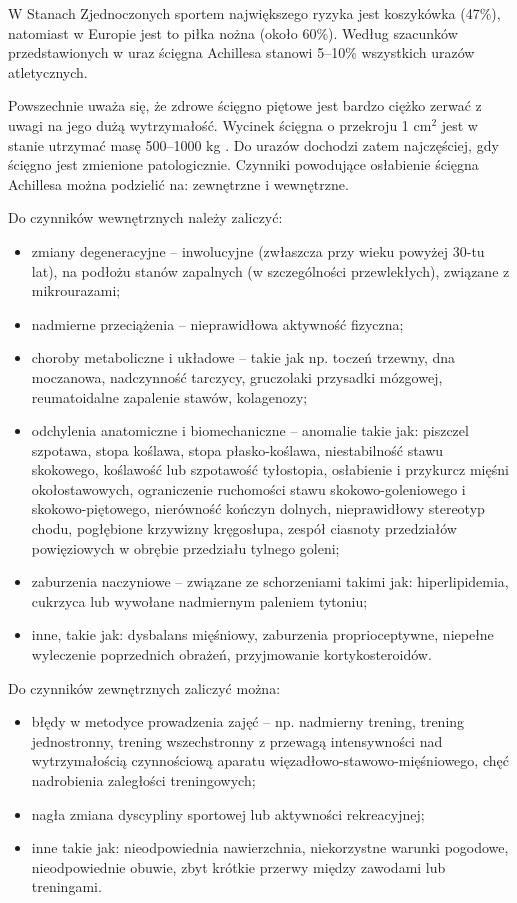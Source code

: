 \newpage
W Stanach Zjednoczonych sportem największego ryzyka jest koszykówka (47\%), natomiast w Europie jest to piłka nożna (około 60\%). Według szacunków przedstawionych w \cite{CHIRALI2014211} uraz ścięgna Achillesa stanowi 5--10\% wszystkich urazów atletycznych.

Powszechnie uważa się, że zdrowe ścięgno piętowe jest bardzo ciężko zerwać \linebreak z uwagi na jego dużą wytrzymałość. Wycinek ścięgna o przekroju 1 cm$^2$ jest w stanie utrzymać masę 500--1000 kg \cite{Maquirriain2011}. Do urazów dochodzi zatem najczęściej, gdy ścięgno jest zmienione patologicznie. Czynniki powodujące osłabienie ścięgna Achillesa można podzielić na: zewnętrzne i wewnętrzne.

Do czynników wewnętrznych należy zaliczyć:
\begin{itemize}[noitemsep,nolistsep]
	\item zmiany degeneracyjne -- inwolucyjne (zwłaszcza przy wieku powyżej 30-tu lat), na podłożu stanów zapalnych (w szczególności przewlekłych), związane z mikrourazami;
	\item nadmierne przeciążenia -- nieprawidłowa aktywność fizyczna;
	\item choroby metaboliczne i układowe -- takie jak np. toczeń trzewny, dna moczanowa, nadczynność tarczycy, gruczolaki przysadki mózgowej, reumatoidalne zapalenie stawów, kolagenozy;
	\item odchylenia anatomiczne i biomechaniczne -- anomalie takie jak: piszczel szpotawa, stopa koślawa, stopa płasko-koślawa, niestabilność stawu skokowego, koślawość lub szpotawość tyłostopia, osłabienie i przykurcz mięśni okołostawowych, ograniczenie ruchomości stawu skokowo-goleniowego i skokowo-piętowego, nierówność kończyn dolnych, nieprawidłowy stereotyp chodu, pogłębione krzywizny kręgosłupa, zespół ciasnoty przedziałów powięziowych w obrębie przedziału tylnego goleni;
	\item zaburzenia naczyniowe -- związane ze schorzeniami takimi jak: hiperlipidemia, cukrzyca lub wywołane nadmiernym paleniem tytoniu;
	\item inne, takie jak: dysbalans mięśniowy, zaburzenia proprioceptywne, niepełne wyleczenie poprzednich obrażeń, przyjmowanie kortykosteroidów.
\end{itemize}

Do czynników zewnętrznych zaliczyć można:
\begin{itemize}[noitemsep,nolistsep]
	\item błędy w metodyce prowadzenia zajęć -- np. nadmierny trening, trening jednostronny, trening wszechstronny z przewagą intensywności nad wytrzymałością czynnościową aparatu więzadłowo-stawowo-mięśniowego, chęć nadrobienia zaległości treningowych;
	\item nagła zmiana dyscypliny sportowej lub aktywności rekreacyjnej;
	\item inne takie jak: nieodpowiednia nawierzchnia, niekorzystne warunki pogodowe, nieodpowiednie obuwie, zbyt krótkie przerwy między zawodami lub treningami.
\end{itemize}

